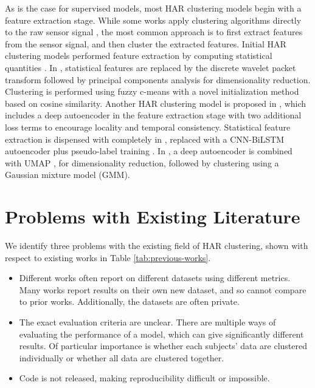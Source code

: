 \documentclass[wcp]{jmlr}
\begin{document}
As is the case for supervised models, most HAR clustering models begin with a feature extraction stage. While some works apply clustering algorithms directly to the raw sensor signal \citep{trabelsi2013unsupervised}, the most common approach is to first extract features from the sensor signal, and then cluster the extracted features. Initial HAR clustering models performed feature extraction by computing statistical quantities \citep{kwon2014unsupervised,machado2015human,lu2017towards}. In \citep{he2017unsupervised}, statistical features are replaced by the discrete wavelet packet transform 
followed by principal components analysis for dimensionality reduction. Clustering is performed using fuzzy c-means with a novel initialization method based on cosine similarity. Another HAR clustering model is proposed in \citep{sheng2020unsupervised}, which includes a deep autoencoder in the feature extraction stage with two additional loss terms to encourage locality and temporal consistency. Statistical feature extraction is dispensed with completely in \citep{ma2021unsupervised}, replaced with a CNN-BiLSTM autoencoder plus pseudo-label training \citep{caron2018deep}. In \citep{mcconville2021n2d}, a deep autoencoder is combined with UMAP \citep{mcinnes2018umap}, for dimensionality reduction, followed by clustering using a Gaussian mixture model (GMM).



\section{Problems with Existing Literature} \label{sec:problems-with-existing}
We identify three problems with the existing field of HAR clustering, shown with respect to existing works in Table \ref{tab:previous-works}.
\begin{itemize}
    \item Different works often report on different datasets using different metrics. Many works report results on their own new dataset, and so cannot compare to prior works. Additionally, the datasets are often private.
    \item The exact evaluation criteria are unclear. There are multiple ways of evaluating the performance of a model, which can give significantly different results. Of particular importance is whether each subjects' data are clustered individually or whether all data are clustered together.  
    \item Code is not released, making reproducibility difficult or impossible.
\end{itemize}
\end{document}
